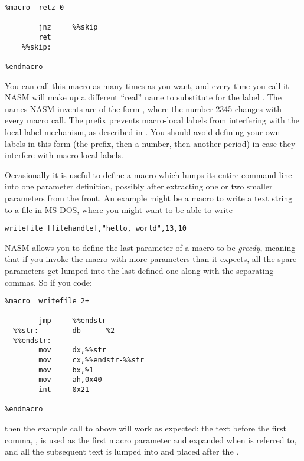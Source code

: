 \begin{lstlisting}
%macro  retz 0

        jnz     %%skip
        ret
    %%skip:

%endmacro
\end{lstlisting}

You can call this macro as many times as you want, and every time
you call it NASM will make up a different ``real'' name to substitute
for the label . The names NASM invents are of the form
, where the number 2345 changes with every macro
call. The  prefix prevents macro-local labels from
interfering with the local label mechanism, as described in
. You should avoid defining your own labels
in this form (the  prefix, then a number, then another period)
in case they interfere with macro-local labels.


Occasionally it is useful to define a macro which lumps its entire
command line into one parameter definition, possibly after
extracting one or two smaller parameters from the front. An example
might be a macro to write a text string to a file in MS-DOS, where
you might want to be able to write

\begin{lstlisting}
writefile [filehandle],"hello, world",13,10
\end{lstlisting}

NASM allows you to define the last parameter of a macro to be
\emph{greedy}, meaning that if you invoke the macro with more
parameters than it expects, all the spare parameters get lumped into
the last defined one along with the separating commas. So if you
code:

\begin{lstlisting}
%macro  writefile 2+

        jmp     %%endstr
  %%str:        db      %2
  %%endstr:
        mov     dx,%%str
        mov     cx,%%endstr-%%str
        mov     bx,%1
        mov     ah,0x40
        int     0x21

%endmacro
\end{lstlisting}

then the example call to  above will work as expected:
the text before the first comma, \code{[filehandle]}, is used as the
first macro parameter and expanded when  is referred to, and
all the subsequent text is lumped into  and placed after the
.


